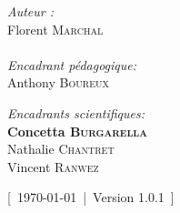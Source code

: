 \documentclass[../main]{subfiles} %
\begin{document}
\begin{titlepage}
\begin{center}
\noindent
\begin{minipage}{0.4\textwidth}
  \begin{flushleft} \large
    \emph{Auteur :}\\
    Florent \textsc{Marchal} \\
     \\
    \emph{Encadrant pédagogique:} \\
    Anthony \textsc{Boureux}\\
    
  \end{flushleft}
\end{minipage}
\begin{minipage}{0.5\textwidth}
  \begin{flushright} \large
    

    \emph{Encadrants scientifiques:} \\
    \textbf{Concetta \textsc{Burgarella}} \\
    Nathalie \textsc{Chantret} \\
    Vincent \textsc{Ranwez}
      \\
    

  \end{flushright}
\end{minipage}

\vfill

{\large [ \today  | Version 1.0.1 ]}

\end{center}
\end{titlepage}


\end{document}
